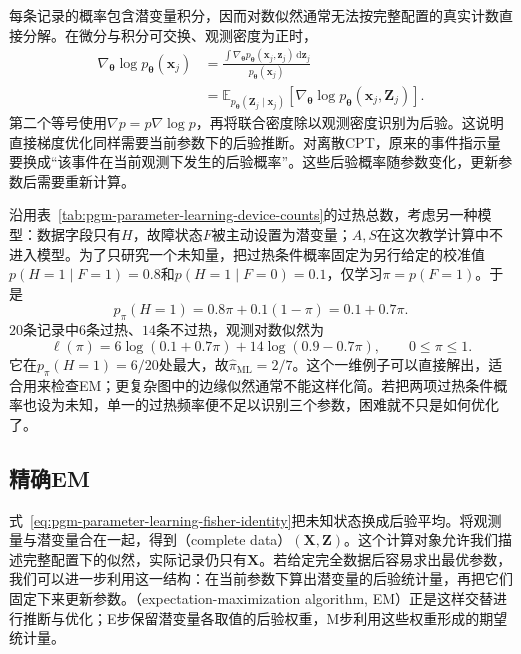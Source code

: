 每条记录的概率包含潜变量积分，因而对数似然通常无法按完整配置的真实计数直接分解。在微分与积分可交换、观测密度为正时，
\begin{equation}
  \begin{aligned}
    \nabla_{\bm{\theta}}\log p_{\bm{\theta}}(\bm{x}_j)
      &=\frac{\int\nabla_{\bm{\theta}}
          p_{\bm{\theta}}(\bm{x}_j,\bm{z}_j)
                  \,\mathrm{d}\bm{z}_j}
             {p_{\bm{\theta}}(\bm{x}_j)}\\
      &=\mathbb{E}_{p_{\bm{\theta}}(\bm{Z}_j\mid\bm{x}_j)}
          [\nabla_{\bm{\theta}}
            \log p_{\bm{\theta}}(\bm{x}_j,\bm{Z}_j)].
  \end{aligned}
  \label{eq:pgm-parameter-learning-fisher-identity}
\end{equation}
第二个等号使用$\nabla p=p\nabla\log p$，再将联合密度除以观测密度识别为后验。这说明直接梯度优化同样需要当前参数下的后验推断。对离散CPT，原来的事件指示量要换成“该事件在当前观测下发生的后验概率”。这些后验概率随参数变化，更新参数后需要重新计算。

沿用表~\ref{tab:pgm-parameter-learning-device-counts}的过热总数，考虑另一种模型：数据字段只有$H$，故障状态$F$被主动设置为潜变量；$A,S$在这次教学计算中不进入模型。为了只研究一个未知量，把过热条件概率固定为另行给定的校准值$p(H=1\mid F=1)=0.8$和$p(H=1\mid F=0)=0.1$，仅学习$\pi=p(F=1)$。于是
\[
  p_\pi(H=1)=0.8\pi+0.1(1-\pi)=0.1+0.7\pi.
\]
$20$条记录中$6$条过热、$14$条不过热，观测对数似然为
\begin{equation}
  \ell(\pi)=6\log(0.1+0.7\pi)
             +14\log(0.9-0.7\pi),\qquad 0\leq\pi\leq1.
  \label{eq:pgm-parameter-learning-device-observed}
\end{equation}
它在$p_\pi(H=1)=6/20$处最大，故$\widehat\pi_{\mathrm{ML}}=2/7$。这个一维例子可以直接解出，适合用来检查EM；更复杂图中的边缘似然通常不能这样化简。若把两项过热条件概率也设为未知，单一的过热频率便不足以识别三个参数，困难就不只是如何优化了。

\subsection{精确EM}
\label{sec:pgm-parameter-learning-em}

式~\eqref{eq:pgm-parameter-learning-fisher-identity}把未知状态换成后验平均。将观测量与潜变量合在一起，得到（complete data）$(\bm{X},\bm{Z})$。这个计算对象允许我们描述完整配置下的似然，实际记录仍只有$\bm{X}$。若给定完全数据后容易求出最优参数，我们可以进一步利用这一结构：在当前参数下算出潜变量的后验统计量，再把它们固定下来更新参数。（expectation-maximization algorithm, EM）正是这样交替进行推断与优化；E步保留潜变量各取值的后验权重，M步利用这些权重形成的期望统计量。

